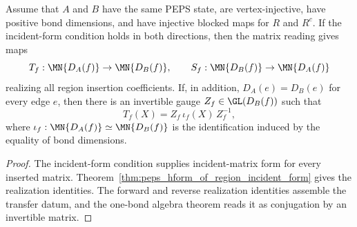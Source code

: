\begin{theorem}
    \label{thm:peps_region_reconcile_to_transfer_gauge}
    \leanok
    Assume that \(A\) and \(B\) have the same PEPS state, are vertex-injective,
    have positive bond dimensions, and have injective blocked maps for \(R\) and
    \(R^c\). If the incident-form condition holds in both directions, then the
    matrix reading gives maps
    \[
        T_f:\MN{D_A(f)}\to\MN{D_B(f)},
        \qquad
        S_f:\MN{D_B(f)}\to\MN{D_A(f)}
    \]
    realizing all region insertion coefficients. If, in addition,
    \(D_A(e)=D_B(e)\) for every edge \(e\), then there is an invertible gauge
    \(Z_f\in\GL(D_B(f))\) such that
    \[
        T_f(X)=Z_f\,\iota_f(X)\,Z_f^{-1},
    \]
    where \(\iota_f:\MN{D_A(f)}\simeq\MN{D_B(f)}\) is the identification induced
    by the equality of bond dimensions.
\end{theorem}
\begin{proof}\leanok
    The incident-form condition supplies incident-matrix form for every inserted
    matrix. Theorem~\ref{thm:peps_hform_of_region_incident_form} gives the
    realization identities. The forward and reverse realization identities
    assemble the transfer datum, and the one-bond algebra theorem reads it as
    conjugation by an invertible matrix.
\end{proof}

